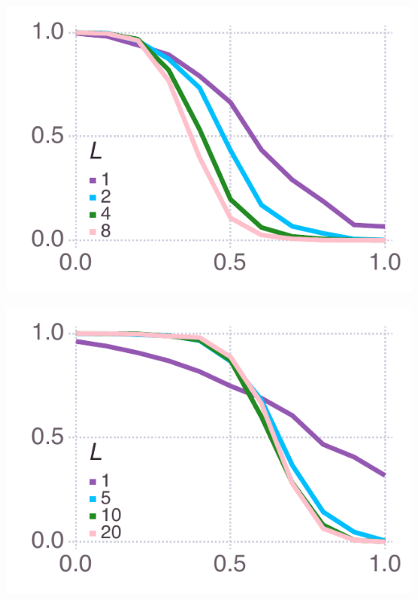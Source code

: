 \documentclass[varwidth=true,crop=false]{standalone}
\begin{document}
	\begin{minipage}{3.75in}%
      \includegraphics[width=\textwidth]{mean_social_learner_over_u_lowpayoff=0.1_nbehaviors=4.pdf}
    \end{minipage}\noindent
	\begin{minipage}{3.75in}%
      \includegraphics[width=\textwidth]{mean_social_learner_over_u_lowpayoff=0.1_nbehaviors=10.pdf}
    \end{minipage}~\\[0.5em]
\end{document}
